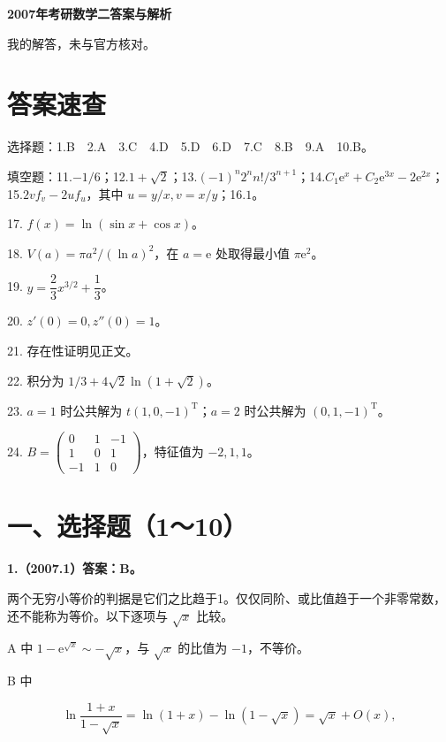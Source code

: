 \documentclass[UTF8,11pt,fontset=windows]{ctexart}
\begin{document}
{\LARGE\bfseries 2007年考研数学二答案与解析\par}\vspace{6pt}

\begingroup\color{gray}我的解答，未与官方核对。\par\endgroup

\section*{答案速查}

\begingroup\color{gray}选择题：1.B　2.A　3.C　4.D　5.D　6.D　7.C　8.B　9.A　10.B。\par\endgroup

\begingroup\color{gray}填空题：11.$-1/6$；12.$1+\sqrt2$；13.$(-1)^n2^n n!/3^{n+1}$；14.$C_1\mathrm e^x+C_2\mathrm e^{3x}-2\mathrm e^{2x}$；15.$2v f_v-2u f_u$，其中 $u=y/x,v=x/y$；16.$1$。\par\endgroup

17. $f(x)=\ln(\sin x+\cos x)$。

18. $V(a)=\pi a^2/(\ln a)^2$，在 $a=\mathrm e$ 处取得最小值 $\pi\mathrm e^2$。

19. $y=\dfrac23x^{3/2}+\dfrac13$。

20. $z'(0)=0,z''(0)=1$。

21. 存在性证明见正文。

22. 积分为 $1/3+4\sqrt2\ln(1+\sqrt2)$。

23. $a=1$ 时公共解为 $t(1,0,-1)^{\mathrm T}$；$a=2$ 时公共解为 $(0,1,-1)^{\mathrm T}$。

24. $B=\begin{pmatrix}0&1&-1\\1&0&1\\-1&1&0\end{pmatrix}$，特征值为 $-2,1,1$。

\clearpage

\section*{一、选择题（1～10）}

\textbf{1.（2007.1）答案：B。}

两个无穷小等价的判据是它们之比趋于1。仅仅同阶、或比值趋于一个非零常数，还不能称为等价。以下逐项与 $\sqrt x$ 比较。

A 中 $1-\mathrm e^{\sqrt x}\sim-\sqrt x$，与 $\sqrt x$ 的比值为 $-1$，不等价。

B 中

$$
\ln\frac{1+x}{1-\sqrt x}
=\ln(1+x)-\ln(1-\sqrt x)
=\sqrt x+O(x),
$$
\end{document}

